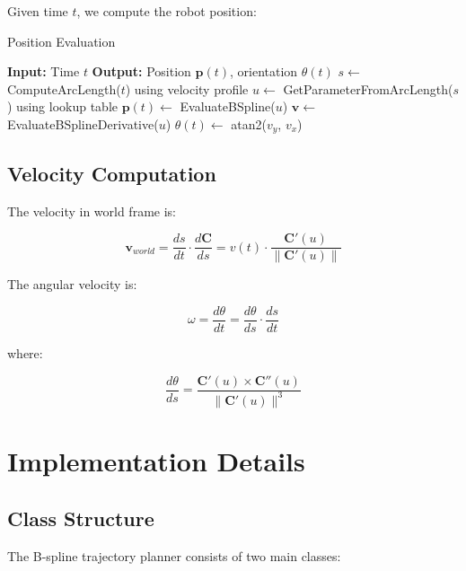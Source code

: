 \documentclass[11pt]{article}
\begin{document}
Given time $t$, we compute the robot position:

\begin{algorithm}
\caption{Position Evaluation}
\begin{algorithmic}
\STATE \textbf{Input:} Time $t$
\STATE \textbf{Output:} Position $\mathbf{p}(t)$, orientation $\theta(t)$
\STATE $s \leftarrow$ ComputeArcLength($t$) using velocity profile
\STATE $u \leftarrow$ GetParameterFromArcLength($s$) using lookup table
\STATE $\mathbf{p}(t) \leftarrow$ EvaluateBSpline($u$)
\STATE $\mathbf{v} \leftarrow$ EvaluateBSplineDerivative($u$)
\STATE $\theta(t) \leftarrow$ atan2($v_y$, $v_x$)
\end{algorithmic}
\end{algorithm}

\subsection{Velocity Computation}

The velocity in world frame is:

\begin{equation}
\mathbf{v}_{world} = \frac{ds}{dt} \cdot \frac{d\mathbf{C}}{ds} = v(t) \cdot \frac{\mathbf{C}'(u)}{\|\mathbf{C}'(u)\|}
\end{equation}

The angular velocity is:

\begin{equation}
\omega = \frac{d\theta}{dt} = \frac{d\theta}{ds} \cdot \frac{ds}{dt}
\end{equation}

where:

\begin{equation}
\frac{d\theta}{ds} = \frac{\mathbf{C}'(u) \times \mathbf{C}''(u)}{\|\mathbf{C}'(u)\|^3}
\end{equation}

\section{Implementation Details}

\subsection{Class Structure}

The B-spline trajectory planner consists of two main classes:
\end{document}
